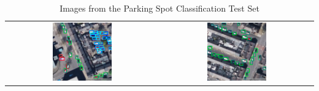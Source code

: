 \begin{table}[htbp]
\begin{tabular}{cc}
        \includegraphics[width=0.4\textwidth]{images/image5_classification_test_set.png} & \includegraphics[width=0.4\textwidth]{images/image6_classification_test_set.png} \\
    \end{tabular}
    \caption{Images from the Parking Spot Classification Test Set}
    \label{tab:test_images3}
\end{table}

\newpage{}